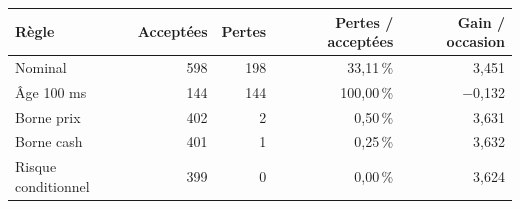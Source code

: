 \begin{tabularx}{\linewidth}{@{}Yrrrr@{}}
\toprule
Règle & Acceptées & Pertes & Pertes / acceptées & Gain / occasion\\
\midrule
Nominal & 598 & 198 & 33,11\,\% & 3,451\\
Âge 100 ms & 144 & 144 & 100,00\,\% & \ensuremath{-}0,132\\
Borne prix & 402 & 2 & 0,50\,\% & 3,631\\
Borne cash & 401 & 1 & 0,25\,\% & 3,632\\
Risque conditionnel & 399 & 0 & 0,00\,\% & 3,624\\
\bottomrule
\end{tabularx}